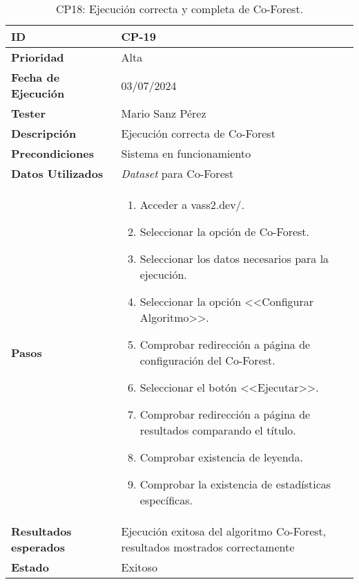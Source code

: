 \begin{table}[ht]
	\centering
	\renewcommand{\arraystretch}{1.5} %
	\begin{tabular}{>{\raggedright\arraybackslash}p{4cm} p{9.5cm}}
    \hline
    \rowcolor{gray!20}
    \textbf{ID} & CP-19\\
    \hline
    \rowcolor{white}
    \textbf{Prioridad} & Alta \\
    \hline
    \rowcolor{gray!20}
    \textbf{Fecha de Ejecución} & 03/07/2024 \\
    \hline
    \rowcolor{white}
    \textbf{Tester} & Mario Sanz Pérez \\
    \hline
    \rowcolor{gray!20}
    \textbf{Descripción} & Ejecución correcta de Co-Forest\\
    \hline
    \rowcolor{white}
    \textbf{Precondiciones} & Sistema en funcionamiento\\
    \hline
    \rowcolor{white}
    \textbf{Datos Utilizados} & \textit{Dataset} para Co-Forest\\
    \hline
    \rowcolor{gray!20}
    \textbf{Pasos} & \begin{enumerate}
        \item Acceder a vass2.dev/.
        \item Seleccionar la opción de Co-Forest.
        \item Seleccionar los datos necesarios para la ejecución.
        \item Seleccionar la opción <<Configurar Algoritmo>>.
        \item Comprobar redirección a página de configuración del Co-Forest.
        \item Seleccionar el botón <<Ejecutar>>.
        \item Comprobar redirección a página de resultados comparando el título.
        \item Comprobar existencia de leyenda.
        \item Comprobar la existencia de estadísticas específicas.
    \end{enumerate}\\
	\hline
    \rowcolor{gray!20}
    \textbf{Resultados esperados} & Ejecución exitosa del algoritmo Co-Forest, resultados mostrados correctamente\\
    \hline
    \rowcolor{white}
    \textbf{Estado} & Exitoso\\
    \hline
\end{tabular}
	\caption[CP19: Ejecución Co-Forest]{CP18: Ejecución correcta y completa de Co-Forest.}
\end{table}

